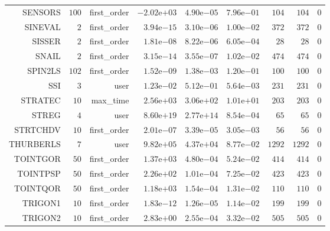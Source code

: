 \begin{longtable}{rrrrrrrrr}
SENSORS & \(   100\) & first\_order & \(-2.02\)e\(+03\) & \( 4.90\)e\(-05\) & \( 7.96\)e\(-01\) & \(   104\) & \(   104\) & \(     0\) \\
SINEVAL & \(     2\) & first\_order & \( 3.94\)e\(-15\) & \( 3.10\)e\(-06\) & \( 1.00\)e\(-02\) & \(   372\) & \(   372\) & \(     0\) \\
SISSER & \(     2\) & first\_order & \( 1.81\)e\(-08\) & \( 8.22\)e\(-06\) & \( 6.05\)e\(-04\) & \(    28\) & \(    28\) & \(     0\) \\
SNAIL & \(     2\) & first\_order & \( 3.15\)e\(-14\) & \( 3.55\)e\(-07\) & \( 1.02\)e\(-02\) & \(   474\) & \(   474\) & \(     0\) \\
SPIN2LS & \(   102\) & first\_order & \( 1.52\)e\(-09\) & \( 1.38\)e\(-03\) & \( 1.20\)e\(-01\) & \(   100\) & \(   100\) & \(     0\) \\
SSI & \(     3\) & user & \( 1.23\)e\(-02\) & \( 5.12\)e\(-01\) & \( 5.64\)e\(-03\) & \(   231\) & \(   231\) & \(     0\) \\
STRATEC & \(    10\) & max\_time & \( 2.56\)e\(+03\) & \( 3.06\)e\(+02\) & \( 1.01\)e\(+01\) & \(   203\) & \(   203\) & \(     0\) \\
STREG & \(     4\) & user & \( 8.60\)e\(+19\) & \( 2.77\)e\(+14\) & \( 8.54\)e\(-04\) & \(    65\) & \(    65\) & \(     0\) \\
STRTCHDV & \(    10\) & first\_order & \( 2.01\)e\(-07\) & \( 3.39\)e\(-05\) & \( 3.05\)e\(-03\) & \(    56\) & \(    56\) & \(     0\) \\
THURBERLS & \(     7\) & user & \( 9.82\)e\(+05\) & \( 4.37\)e\(+04\) & \( 8.77\)e\(-02\) & \(  1292\) & \(  1292\) & \(     0\) \\
TOINTGOR & \(    50\) & first\_order & \( 1.37\)e\(+03\) & \( 4.80\)e\(-04\) & \( 5.24\)e\(-02\) & \(   414\) & \(   414\) & \(     0\) \\
TOINTPSP & \(    50\) & first\_order & \( 2.26\)e\(+02\) & \( 1.01\)e\(-04\) & \( 7.25\)e\(-02\) & \(   423\) & \(   423\) & \(     0\) \\
TOINTQOR & \(    50\) & first\_order & \( 1.18\)e\(+03\) & \( 1.54\)e\(-04\) & \( 1.31\)e\(-02\) & \(   110\) & \(   110\) & \(     0\) \\
TRIGON1 & \(    10\) & first\_order & \( 1.83\)e\(-12\) & \( 1.26\)e\(-05\) & \( 1.14\)e\(-02\) & \(   199\) & \(   199\) & \(     0\) \\
TRIGON2 & \(    10\) & first\_order & \( 2.83\)e\(+00\) & \( 2.55\)e\(-04\) & \( 3.32\)e\(-02\) & \(   505\) & \(   505\) & \(     0\) \\

\end{longtable}
